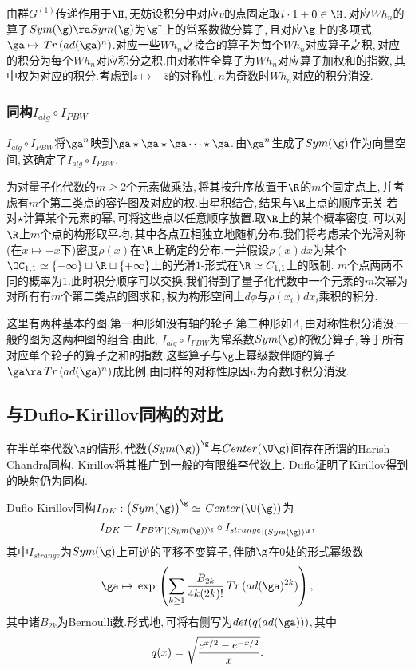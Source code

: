 由群$G^{(1)}$传递作用于$\H$,\,无妨设积分中对应$v$的点固定取$i\cdot 1+0\in\H$.\,对应$Wh_n$的算子$Sym(\g)\ra Sym(\g)$为$\g^*$上的常系数微分算子,\,且对应$\g$上的多项式$\ga\mapsto \,Tr\,(ad(\ga)^n)$.对应一些$Wh_n$之接合的算子为每个$Wh_n$对应算子之积,\,对应的积分为每个$Wh_n$对应积分之积.由对称性全算子为$Wh_n$对应算子加权和的指数,\,其中权为对应的积分.考虑到$z\mapsto -\overline{z}$的对称性,\,$n$为奇数时$Wh_n$对应的积分消没.


\subsubsection{同构$I_{alg}\circ I_{PBW}$}

$I_{alg}\circ I_{PBW}$将$\ga^n$映到$\ga\star\ga\star\ga\dots\star\ga$.\,由$\ga^n$生成了$Sym(\g)$作为向量空间,\,这确定了$I_{alg}\circ I_{PBW}$.

为对量子化代数的$m\ge 2$个元素做乘法,\,将其按升序放置于$\R$的$m$个固定点上,\,并考虑有$m$个第二类点的容许图及对应的权.由星积结合,\,结果与$\R$上点的顺序无关.若对$\star$计算某个元素的幂,\,可将这些点以任意顺序放置.取$\R$上的某个概率密度,\,可以对$\R$上$m$个点的构形取平均,\,其中各点互相独立地随机分布.我们将考虑某个光滑对称(在$x\mapsto -x$下)密度$\rho(x)$在$\R$上确定的分布.一并假设$\rho(x)dx$为某个$\OC_{1,1}\simeq \{-\infty\}\sqcup \R\sqcup \{+\infty\}$上的光滑$1$-形式在$\R\simeq C_{1,1}$上的限制.\,\,$m$个点两两不同的概率为$1$.此时积分顺序可以交换.我们得到了量子化代数中一个元素的$m$次幂为对所有有$m$个第二类点的图求和,\,权为构形空间上$d\phi$与$\rho(x_i)dx_i$乘积的积分.

这里有两种基本的图.第一种形如没有轴的轮子.第二种形如$\Lambda$,\,由对称性积分消没.一般的图为这两种图的组合.由此,\,\,$I_{alg}\circ I_{PBW}$为常系数$Sym(\g)$的微分算子,\,等于所有对应单个轮子的算子之和的指数.这些算子与$\g$上幂级数伴随的算子$\ga \ra \,Tr\,(ad(\ga)^n)$成比例.由同样的对称性原因$n$为奇数时积分消没.



\subsection{与Duflo-Kirillov同构的对比}

在半单李代数$\g$的情形,\,代数$\bigl(Sym(\g)\bigr)^{\g}$与$Center(\U\g)$间存在所谓的Harish-Chandra同构.\,\,Kirillov将其推广到一般的有限维李代数上.\,\,Duflo证明了Kirillov得到的映射仍为同构.

Duflo-Kirillov同构$I_{DK}:\bigl(Sym(\g)\bigr)^{\g}\simeq \,Center( \U(\g))$为
$$I_{DK}= {I_{PBW}}_{|(Sym(\g))^{\g}}\circ {I_{strange}}_{|(Sym(\g))^{\g}},$$
其中$I_{strange}$为$Sym(\g)$上可逆的平移不变算子,\,伴随$\g$在$0$处的形式幂级数
$$\ga\mapsto \,{\rm exp}\,  \left(\sum_{k\ge 1} {B_{2k}\over 4 k (2k)!}\, Tr \, (ad(\ga)^{2k})\right) ,$$
其中诸$B_{2k}$为Bernoulli数.形式地,\,可将右侧写为$det(q(ad(\ga)))$,\,其中
$$q(x)=\sqrt{ {e^{x/2}-e^{-x/2}\over x}}.$$

